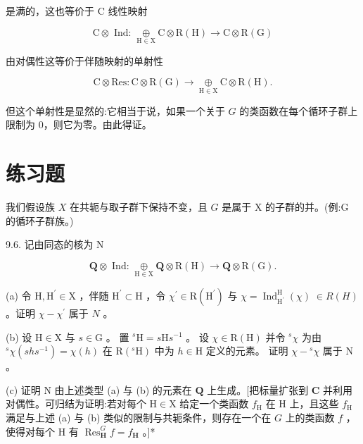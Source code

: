 \documentclass[10pt]{article}
\begin{document}
是满的，这也等价于 C 线性映射

\[
\mathrm{C} \otimes  \text{ Ind: }\underset{\mathrm{H} \in  \mathrm{X}}{ \oplus  }\mathrm{C} \otimes  \mathrm{R}\left( \mathrm{H}\right)  \rightarrow  \mathrm{C} \otimes  \mathrm{R}\left( \mathrm{G}\right)
\]

由对偶性这等价于伴随映射的单射性

\[
\mathrm{C} \otimes  \mathrm{{Res}} : \mathrm{C} \otimes  \mathrm{R}\left( \mathrm{G}\right)  \rightarrow  \underset{\mathrm{H} \in  \mathrm{X}}{ \oplus  }\mathrm{C} \otimes  \mathrm{R}\left( \mathrm{H}\right) .
\]

但这个单射性是显然的:它相当于说，如果一个关于 \(G\) 的类函数在每个循环子群上限制为 0，则它为零。由此得证。

\section*{练习题}

我们假设族 \(X\) 在共轭与取子群下保持不变，且 \(G\) 是属于 X 的子群的并。(例:G 的循环子群族。)

9.6. 记由同态的核为 \(\mathrm{N}\)

\[
\mathbf{Q} \otimes  \text{ Ind: }\underset{\mathrm{H} \in  \mathrm{X}}{ \oplus  }\mathbf{Q} \otimes  \mathrm{R}\left( \mathrm{H}\right)  \rightarrow  \mathbf{Q} \otimes  \mathrm{R}\left( \mathrm{G}\right) .
\]

(a) 令 \(\mathrm{H},{\mathrm{H}}^{\prime } \in  \mathrm{X}\) ，伴随 \({\mathrm{H}}^{\prime } \subset  \mathrm{H}\) ，令 \({\chi }^{\prime } \in  \mathrm{R}\left( {\mathrm{H}}^{\prime }\right)\) 与 \(\chi  = {\operatorname{Ind}}_{{\mathrm{H}}^{\prime }}^{\mathrm{H}}\left( \chi \right) \; \in  R\left( H\right)\) 。证明 \(\chi  - {\chi }^{\prime }\) 属于 \(N\) 。

(b) 设 \(\mathrm{H} \in  \mathrm{X}\) 与 \(s \in  \mathrm{G}\) 。 置 \({}^{s}\mathrm{H} = s\mathrm{H}{s}^{-1}\) 。 设 \(\chi  \in  \mathrm{R}\left( \mathrm{H}\right)\) 并令 \({}^{s}\chi\) 为由 \({}^{s}\chi \left( {{sh}{s}^{-1}}\right)  = \chi \left( h\right)\) 在 \(\mathrm{R}\left( {{}^{s}\mathrm{H}}\right)\) 中为 \(h \in  \mathrm{H}\) 定义的元素。 证明 \(\chi  - {}^{s}\chi\) 属于 \(\mathrm{N}\) 。

(c) 证明 \(\mathrm{N}\) 由上述类型 (a) 与 (b) 的元素在 \(\mathbf{Q}\) 上生成。[把标量扩张到 \(\mathbf{C}\) 并利用对偶性。可归结为证明:若对每个 \(\mathrm{H} \in  \mathrm{X}\) 给定一个类函数 \({f}_{\mathrm{H}}\) 在 \(\mathrm{H}\) 上，且这些 \({f}_{\mathrm{H}}\) 满足与上述 (a) 与 (b) 类似的限制与共轭条件，则存在一个在 \(G\) 上的类函数 \(f\) ，使得对每个 H 有 \({\operatorname{Res}}_{\mathbf{H}}^{G}f = {f}_{\mathbf{H}}\) 。]*
\end{document}
